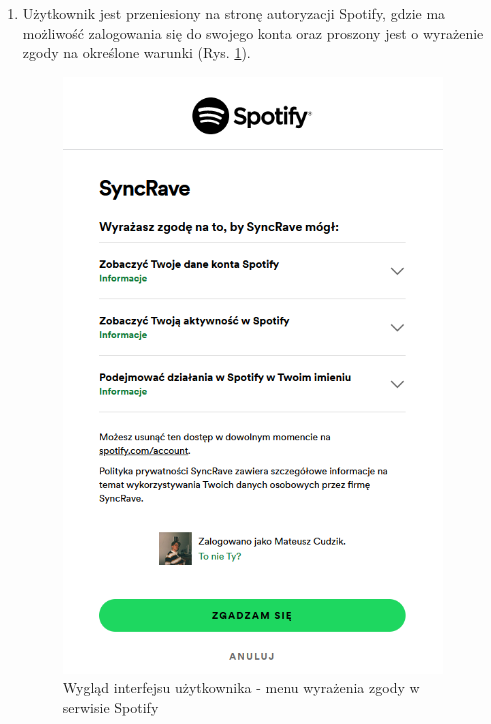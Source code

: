 \begin{enumerate}
\item Użytkownik jest przeniesiony na stronę autoryzacji Spotify, gdzie ma możliwość zalogowania się do swojego konta oraz proszony jest o wyrażenie zgody na określone warunki (Rys. \ref{fig:spotify-menu}).
\begin{figure}[h]
\centering
\includegraphics[width=0.95\textwidth]{./graf/spotify_permission.PNG}
\caption{Wygląd interfejsu użytkownika - menu wyrażenia zgody w serwisie Spotify}
\label{fig:spotify-menu}
\end{figure}


\end{enumerate}
